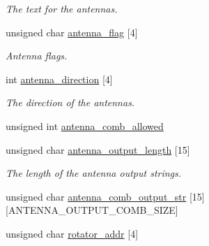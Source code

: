 \begin{CompactItemize}
\begin{CompactList}\small\item\em The text for the antennas. \item\end{CompactList}\item 
\hypertarget{structstruct__antenna_06b55834fdd04ee8eca3580719348964}{
unsigned char \hyperlink{structstruct__antenna_06b55834fdd04ee8eca3580719348964}{antenna\_\-flag} \mbox{[}4\mbox{]}}
\label{structstruct__antenna_06b55834fdd04ee8eca3580719348964}

\begin{CompactList}\small\item\em Antenna flags. \item\end{CompactList}\item 
\hypertarget{structstruct__antenna_79d2c9051c11e4688ec6d1dd8f4c5749}{
int \hyperlink{structstruct__antenna_79d2c9051c11e4688ec6d1dd8f4c5749}{antenna\_\-direction} \mbox{[}4\mbox{]}}
\label{structstruct__antenna_79d2c9051c11e4688ec6d1dd8f4c5749}

\begin{CompactList}\small\item\em The direction of the antennas. \item\end{CompactList}\item 
unsigned int \hyperlink{structstruct__antenna_68cf21855c1c6f735d8b536530791f3c}{antenna\_\-comb\_\-allowed}
\item 
\hypertarget{structstruct__antenna_536927bb35e8558f37be1569433d5809}{
unsigned char \hyperlink{structstruct__antenna_536927bb35e8558f37be1569433d5809}{antenna\_\-output\_\-length} \mbox{[}15\mbox{]}}
\label{structstruct__antenna_536927bb35e8558f37be1569433d5809}

\begin{CompactList}\small\item\em The length of the antenna output strings. \item\end{CompactList}\item 
unsigned char \hyperlink{structstruct__antenna_b07514740fffae4fcfa8800f8c37547e}{antenna\_\-comb\_\-output\_\-str} \mbox{[}15\mbox{]}\mbox{[}ANTENNA\_\-OUTPUT\_\-COMB\_\-SIZE\mbox{]}
\item 
\hypertarget{structstruct__antenna_9cee17f102ab89fea878337bdf571abf}{
unsigned char \hyperlink{structstruct__antenna_9cee17f102ab89fea878337bdf571abf}{rotator\_\-addr} \mbox{[}4\mbox{]}}
\label{structstruct__antenna_9cee17f102ab89fea878337bdf571abf}


\end{CompactItemize}
